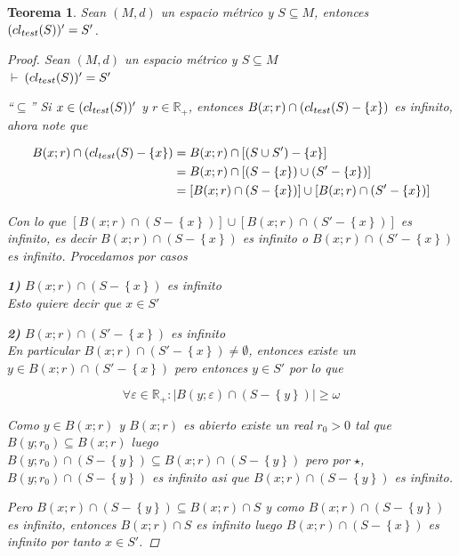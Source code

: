 \documentclass[oneside]{book} %
\theoremstyle{Teorema}
\newtheorem{Teorema}[Definicion]{Teorema}
\theoremstyle{Ejemplos}
\theoremstyle{[Obs]}
\def \test {test}
\newcommand{\card}[1]{\left|#1\right|} %
\newcommand{\cerradura}[2][\test]{\ifx \test #1 {\overline{#2}} \else {cl_{#1}(#2)} \fi} %
\renewcommand{\{}{\left\lbrace} %
\renewcommand{\}}{\right\rbrace} %
\renewcommand{\u}{\cup} %
\newcommand{\n}{\cap} %
\renewcommand{\sc}{\subseteq} %
\newcommand{\R}{\mathbb{R}} %
\newcommand{\pd}{$\vdash\ $} %
\begin{document}
			\begin{Teorema}\setlength{\parindent}{0em}
			
				Sean $(M, d)$ un espacio métrico y $S \sc M$, entonces $(\cerradura{S})' = S'$.

				\begin{proof}
					
					Sean $(M, d)$ un espacio métrico y $S \sc M$ \\ 
					\pd $(\cerradura{S})' = S'$ 

					``$\sc$'' Si $x \in (\cerradura{S})'$ y $r \in \R_{+}$, entonces $B(x;r) \n (\cerradura{S} - \{ x \})$ es infinito, ahora note que 
					
					\begin{align*}
						B(x;r) \n (\cerradura{S} - \{ x \}) &= B(x;r) \n [(S \u S') - \{ x \}] \\ 
						&= B(x;r) \n [(S - \{ x \}) \u (S' - \{ x \})] \\ 
						&= [ B(x;r) \n (S - \{ x \}) ] \u [ B(x;r) \n (S' - \{ x \}) ]
					\end{align*}
				
					Con lo que $[ B(x;r) \n (S - \{ x \}) ] \u [ B(x;r) \n (S' - \{ x \}) ]$ es infinito, es decir $B(x;r) \n (S - \{ x \})$ es infinito o $B(x;r) \n (S' - \{ x \})$ es infinito. Procedamos por casos 

					\textbf{1)} $B(x;r) \n (S - \{ x \})$ es infinito \\ 
					Esto quiere decir que $x \in S'$

					\textbf{2)} $B(x;r) \n (S' - \{ x \})$ es infinito \\ 
					En particular $B(x;r) \n (S' - \{ x \}) \neq \emptyset$, entonces existe un $y \in B(x;r) \n (S' - \{ x \})$ pero entonces $y \in S'$ por lo que 

					\begin{equation*}\tag{$\star$}
						\forall \varepsilon \in \R_{+} : \card{ B(y;\varepsilon) \n (S - \{ y \})} \geq \omega
					\end{equation*}

					Como $y \in B(x;r)$ y $B(x;r)$ es abierto existe un real $r_0 > 0$ tal que $B(y;r_0) \sc B(x;r)$ luego $B(y;r_0) \n (S - \{ y \}) \sc B(x;r) \n (S - \{ y \})$ pero por $\star$, $B(y;r_0) \n (S - \{ y \})$ es infinito asi que $B(x;r) \n (S - \{ y \})$ es infinito.

					Pero $B(x;r) \n (S - \{ y \}) \sc B(x;r) \n S$ y como $B(x;r) \n (S - \{ y \})$ es infinito, entonces $B(x;r) \n S$ es infinito luego $B(x;r) \n (S - \{ x \})$ es infinito por tanto $x \in S'$.


\end{proof}
\end{Teorema}
\end{document}
